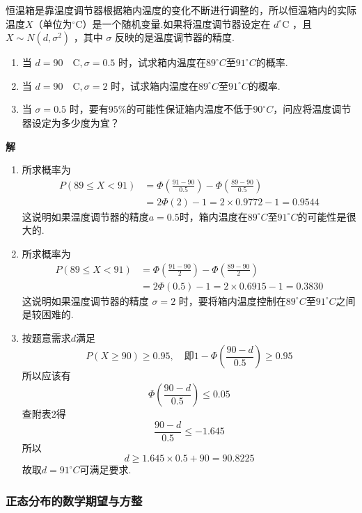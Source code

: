 \begin{example}
	恒温箱是靠温度调节器根据箱内温度的变化不断进行调整的，所以恒温箱内的实际温度$ X $（单位为$ ^{\circ}\mathrm{C} $）是一个随机变量.如果将温度调节器设定在 $ d^{\circ}\mathrm{C} $ ，且 $X \sim N\left(d, \sigma^{2}\right)$ ，其中 $\sigma$ 反映的是温度调节器的精度.
	\begin{enumerate}
		\item 当 $d=90 \quad \mathrm{C}, \sigma=0.5$ 时，试求箱内温度在$ 89^{\circ}C $至$ 91^{\circ}C $的概率.
		\item 当 $d=90 \quad \mathrm{C}, \sigma=2$ 时，试求箱内温度在$ 89^{\circ}C $至$ 91^{\circ}C $的概率.
		\item 当 $\sigma=0.5$ 时，要有$ 95\% $的可能性保证箱内温度不低于$ 90^{\circ}C $，问应将温度调节器设定为多少度为宜？
	\end{enumerate}
	
	\textbf{解}
	\begin{enumerate}
		\item 所求概率为
		\[
		\begin{aligned} P(89 \leqslant X<91) &=\Phi\left(\frac{91-90}{0.5}\right)-\Phi\left(\frac{89-90}{0.5}\right) \\ &=2 \Phi(2)-1=2 \times 0.9772-1=0.9544 \end{aligned}
		\]
		这说明如果温度调节器的精度$ a=0.5 $时，箱内温度在$ 89^{\circ}C $至$ 91^{\circ}C $的可能性是很大的.
		\item 所求概率为
		\[
		\begin{aligned} P(89 \leqslant X<91) &=\Phi\left(\frac{91-90}{2}\right)-\Phi\left(\frac{89-90}{2}\right) \\ &=2 \Phi(0.5)-1=2 \times 0.6915-1=0.3830 \end{aligned}
		\]
		这说明如果温度调节器的精度 $\sigma=2$ 时，要将箱内温度控制在$ 89^{\circ}C $至$ 91^{\circ}C $之间是较困难的.
		\item 按题意需求$ d $满足
		\[
		P(X \geqslant 90) \geqslant 0.95, \quad \text {即} 1-\Phi\left(\frac{90-d}{0.5}\right) \geqslant 0.95
		\]
		所以应该有
		\[
		\Phi\left(\frac{90-d}{0.5}\right) \leqslant 0.05
		\]
		查附表2得
		\[
		\frac{90-d}{0.5} \leqslant-1.645
		\]
		所以
		\[
		d \geqslant 1.645 \times 0.5+90=90.8225
		\]
		故取$ d=91^{\circ}C $可满足要求.
	\end{enumerate}
\end{example}

\subsubsection{正态分布的数学期望与方整}


